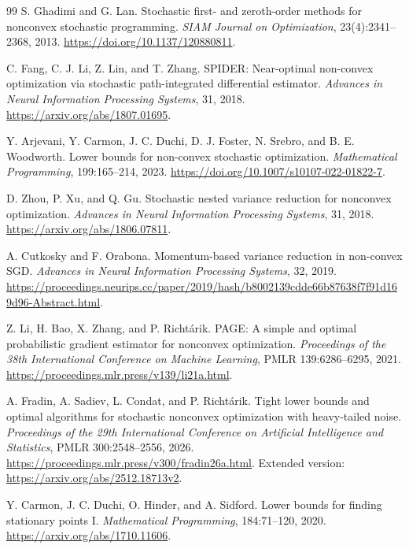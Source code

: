 \documentclass[11pt]{article}
\theoremstyle{definition}
\theoremstyle{remark}
\begin{document}
\begin{thebibliography}{99}
S. Ghadimi and G. Lan.
\newblock Stochastic first- and zeroth-order methods for nonconvex stochastic programming.
\newblock \emph{SIAM Journal on Optimization}, 23(4):2341--2368, 2013.
\newblock \url{https://doi.org/10.1137/120880811}.

C. Fang, C. J. Li, Z. Lin, and T. Zhang.
\newblock SPIDER: Near-optimal non-convex optimization via stochastic path-integrated differential estimator.
\newblock \emph{Advances in Neural Information Processing Systems}, 31, 2018.
\newblock \url{https://arxiv.org/abs/1807.01695}.

Y. Arjevani, Y. Carmon, J. C. Duchi, D. J. Foster, N. Srebro, and B. E. Woodworth.
\newblock Lower bounds for non-convex stochastic optimization.
\newblock \emph{Mathematical Programming}, 199:165--214, 2023.
\newblock \url{https://doi.org/10.1007/s10107-022-01822-7}.

D. Zhou, P. Xu, and Q. Gu.
\newblock Stochastic nested variance reduction for nonconvex optimization.
\newblock \emph{Advances in Neural Information Processing Systems}, 31, 2018.
\newblock \url{https://arxiv.org/abs/1806.07811}.

A. Cutkosky and F. Orabona.
\newblock Momentum-based variance reduction in non-convex SGD.
\newblock \emph{Advances in Neural Information Processing Systems}, 32, 2019.
\newblock \url{https://proceedings.neurips.cc/paper/2019/hash/b8002139cdde66b87638f7f91d169d96-Abstract.html}.

Z. Li, H. Bao, X. Zhang, and P. Richt\'arik.
\newblock PAGE: A simple and optimal probabilistic gradient estimator for nonconvex optimization.
\newblock \emph{Proceedings of the 38th International Conference on Machine Learning}, PMLR 139:6286--6295, 2021.
\newblock \url{https://proceedings.mlr.press/v139/li21a.html}.

A. Fradin, A. Sadiev, L. Condat, and P. Richt\'arik.
\newblock Tight lower bounds and optimal algorithms for stochastic nonconvex optimization with heavy-tailed noise.
\newblock \emph{Proceedings of the 29th International Conference on Artificial Intelligence and Statistics}, PMLR 300:2548--2556, 2026.
\newblock \url{https://proceedings.mlr.press/v300/fradin26a.html}.
\newblock Extended version: \url{https://arxiv.org/abs/2512.18713v2}.

Y. Carmon, J. C. Duchi, O. Hinder, and A. Sidford.
\newblock Lower bounds for finding stationary points I.
\newblock \emph{Mathematical Programming}, 184:71--120, 2020.
\newblock \url{https://arxiv.org/abs/1710.11606}.


\end{thebibliography}
\end{document}
